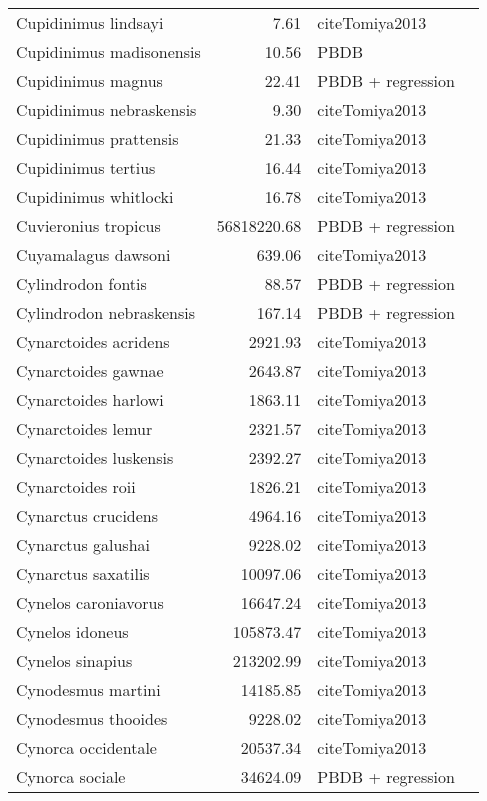 \begin{table}[ht]
\begin{tabular}{lrll}
  Cupidinimus lindsayi & 7.61 & cite{Tomiya2013} &  \\ 
  Cupidinimus madisonensis & 10.56 & PBDB &  \\ 
  Cupidinimus magnus & 22.41 & PBDB + regression &  \\ 
  Cupidinimus nebraskensis & 9.30 & cite{Tomiya2013} &  \\ 
  Cupidinimus prattensis & 21.33 & cite{Tomiya2013} &  \\ 
  Cupidinimus tertius & 16.44 & cite{Tomiya2013} &  \\ 
  Cupidinimus whitlocki & 16.78 & cite{Tomiya2013} &  \\ 
  Cuvieronius tropicus & 56818220.68 & PBDB + regression &  \\ 
  Cuyamalagus dawsoni & 639.06 & cite{Tomiya2013} &  \\ 
  Cylindrodon fontis & 88.57 & PBDB + regression &  \\ 
  Cylindrodon nebraskensis & 167.14 & PBDB + regression &  \\ 
  Cynarctoides acridens & 2921.93 & cite{Tomiya2013} &  \\ 
  Cynarctoides gawnae & 2643.87 & cite{Tomiya2013} &  \\ 
  Cynarctoides harlowi & 1863.11 & cite{Tomiya2013} &  \\ 
  Cynarctoides lemur & 2321.57 & cite{Tomiya2013} &  \\ 
  Cynarctoides luskensis & 2392.27 & cite{Tomiya2013} &  \\ 
  Cynarctoides roii & 1826.21 & cite{Tomiya2013} &  \\ 
  Cynarctus crucidens & 4964.16 & cite{Tomiya2013} &  \\ 
  Cynarctus galushai & 9228.02 & cite{Tomiya2013} &  \\ 
  Cynarctus saxatilis & 10097.06 & cite{Tomiya2013} &  \\ 
  Cynelos caroniavorus & 16647.24 & cite{Tomiya2013} &  \\ 
  Cynelos idoneus & 105873.47 & cite{Tomiya2013} &  \\ 
  Cynelos sinapius & 213202.99 & cite{Tomiya2013} &  \\ 
  Cynodesmus martini & 14185.85 & cite{Tomiya2013} &  \\ 
  Cynodesmus thooides & 9228.02 & cite{Tomiya2013} &  \\ 
  Cynorca occidentale & 20537.34 & cite{Tomiya2013} &  \\ 
  Cynorca sociale & 34624.09 & PBDB + regression &  \\ 

\end{tabular}
\end{table}
